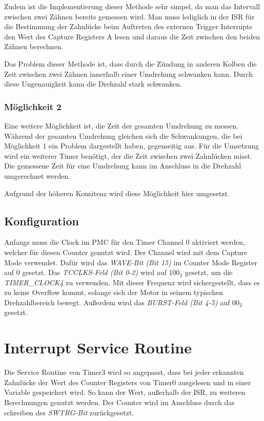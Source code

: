 \documentclass[12pt]{article}
\begin{document}
Zudem ist die Implementierung dieser Methode sehr simpel, da man das Intervall zwischen zwei Zähnen bereits gemessen wird.
Man muss lediglich in der ISR für die Bestimmung der Zahnlücke beim Auftreten des externen Trigger Interrupts den Wert des
Capture Registers A lesen und daraus die Zeit zwischen den beiden Zähnen berechnen. 

Das Problem dieser Methode ist, dass durch die Zündung in anderen Kolben die Zeit zwischen zwei Zähnen
innerhalb einer Umdrehung schwanken kann. Durch diese Ungenauigkeit kann die Drehzahl stark schwanken.

\subsubsection{Möglichkeit 2}
Eine weitere Möglichkeit ist, die Zeit der gesamten Umdrehung zu messen.
Während der gesamten Umdrehung gleichen sich die Schwankungen, die bei Möglichkeit 1 ein Problem dargestellt haben,
gegenseitig aus.
Für die Umsetzung wird ein weiterer Timer benötigt, der die Zeit zwischen zwei Zahnlücken misst.
Die gemessene Zeit für eine Umdrehung kann im Anschluss in die Drehzahl umgerechnet werden.

Aufgrund der höheren Konsitenz wird diese Möglichkeit hier umgesetzt.

\subsection{Konfiguration}
Anfangs muss die Clock im PMC für den Timer Channel 0 aktiviert werden, welcher für diesen Counter genutzt wird.
Der Channel wird mit dem Capture Mode verwendet. Dafür wird das \textit{WAVE-Bit (Bit 15)} im Counter Mode Register auf 0 gesetzt.
Das \textit{TCCLKS-Feld (Bit 0-2)} wird auf $100_2$ gesetzt, um die \textit{TIMER\_CLOCK4} zu verwenden.
Mit dieser Frequenz wird sichergestellt, dass es zu keine Overflow kommt, solange sich der Motor in seinem typischen Drehzahlbereich bewegt.
Außerdem wird das \textit{BURST-Feld (Bit 4-5)} auf $00_2$ gesetzt.


\section{Interrupt Service Routine}
Die Service Routine von Timer3 wird so angepasst, dass bei jeder erkannten Zahnlücke der Wert des Counter Registers von Timer0 ausgelesen
und in einer Variable gespeichert wird. So kann der Wert, außerhalb der ISR, zu weiteren Berechnungen genutzt werden.
Der Counter wird im Anschluss durch das schreiben des \textit{SWTRG-Bit} zurückgesetzt.
\end{document}
